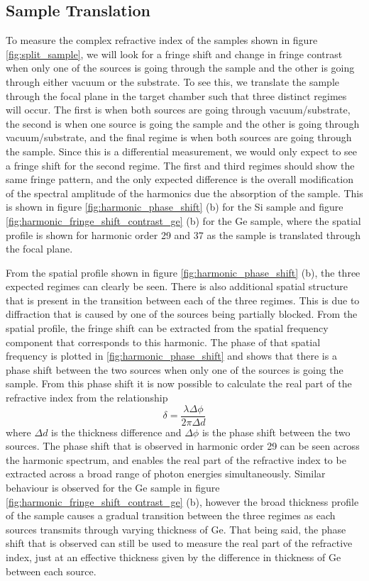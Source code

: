 \subsection{Sample Translation}
To measure the complex refractive index of the samples shown in figure \ref{fig:split_sample}, we will look for a fringe shift and change in fringe contrast when only one of the sources is going through the sample and the other is going through either vacuum or the substrate.  To see this, we translate the sample through the focal plane in the target chamber such that three distinct regimes will occur.  The first is when both sources are going through vacuum/substrate, the second is when one source is going the sample and the other is going through vacuum/substrate, and the final regime is when both sources are going through the sample.  Since this is a differential measurement, we would only expect to see a fringe shift for the second regime.  The first and third regimes should show the same fringe pattern, and the only expected difference is the overall modification of the spectral amplitude of the harmonics due the absorption of the sample.  This is shown in figure \ref{fig:harmonic_phase_shift} (b) for the Si sample and figure \ref{fig:harmonic_fringe_shift_contrast_ge} (b) for the Ge sample, where the spatial profile is shown for harmonic order 29 and 37 as the sample is translated through the focal plane.

From the spatial profile shown in figure \ref{fig:harmonic_phase_shift} (b), the three expected regimes can clearly be seen.  There is also additional spatial structure that is present in the transition between each of the three regimes.  This is due to diffraction that is caused by one of the sources being partially blocked.  From the spatial profile, the fringe shift can be extracted from the spatial frequency component that corresponds to this harmonic.  The phase of that spatial frequency is plotted in \ref{fig:harmonic_phase_shift} and shows that there is a phase shift between the two sources when only one of the sources is going the sample.  From this phase shift it is now possible to calculate the real part of the refractive index from the relationship
\begin{equation}
	\label{eqn:fringe_shift_x}
	\delta = \frac{\lambda\Delta\phi}{2\pi\Delta d}
\end{equation}  
where $\Delta d$ is the thickness difference and $\Delta \phi$ is the phase shift between the two sources.  The phase shift that is observed in harmonic order 29 can be seen across the harmonic spectrum, and enables the real part of the refractive index to be extracted across a broad range of photon energies simultaneously.  Similar behaviour is observed for the Ge sample in figure \ref{fig:harmonic_fringe_shift_contrast_ge} (b), however the broad thickness profile of the sample causes a gradual transition between the three regimes as each sources transmits through varying thickness of Ge.  That being said, the phase shift that is observed can still be used to measure the real part of the refractive index, just at an effective thickness given by the difference in thickness of Ge between each source.

